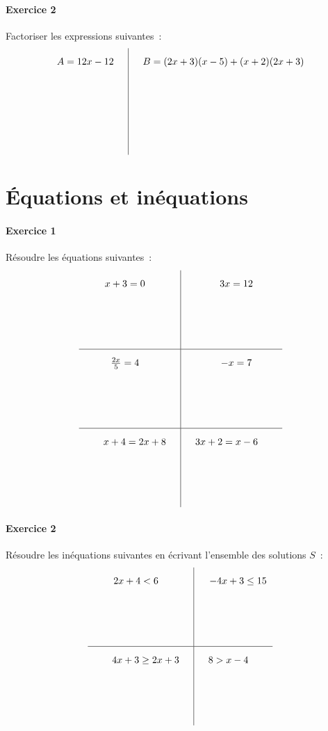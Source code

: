\documentclass[a4paper]{article}
\begin{document}
  \paragraph{Exercice 2}
  Factoriser les expressions suivantes~:
  \[
    \def\arraystretch{2}
    \begin{array}{c|c}
      A = 12x - 12 \quad&\quad B = (2x+3)(x-5) + (x+2)(2x+3)\\[3cm]
    \end{array}
  \]

  \section*{Équations et inéquations}
  \paragraph{Exercice 1}
  Résoudre les équations suivantes~:
  \[
    \def\arraystretch{2}
    \begin{array}{c|c}
      x + 3 = 0 \quad&\quad 3x = 12\\[2cm]
      \hline
      \frac{2x}{5} = 4 \quad&\quad -x = 7\\[2cm]
      \hline
      \quad\quad x + 4 = 2x + 8 \quad&\quad 3x + 2 = x - 6 \quad\quad\\[2cm]
    \end{array}
  \]

  \paragraph{Exercice 2}
  Résoudre les inéquations suivantes en écrivant l'ensemble des solutions $S$~:
  \[
    \def\arraystretch{2}
    \begin{array}{c|c}
      2x + 4 < 6 \quad&\quad -4x + 3 \leq 15\\[2cm]
      \hline
      \quad\quad 4x + 3 \geq 2x + 3 \quad&\quad 8 > x - 4 \quad\quad\\[2cm]
    \end{array}
  \]
\end{document}
